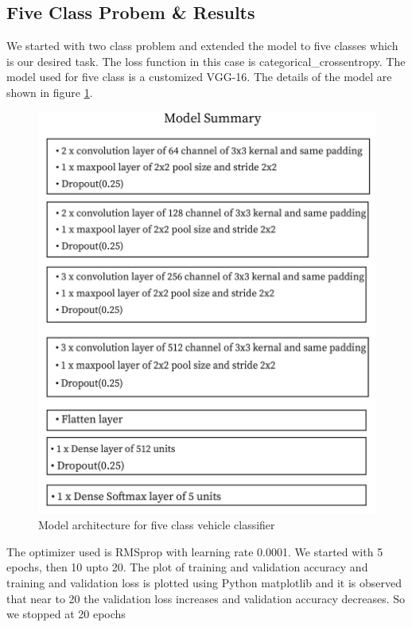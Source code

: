 \subsection{Five Class Probem \& Results}
We started with two class problem and extended the model to five classes
which is our desired task. The loss function in this case is categorical\_crossentropy.
The model used for five class is a customized VGG-16. The details of the
model are shown in figure \ref{model_summary}.
\begin{figure}[H]
    \centering
    \captionsetup{justification = centering}
    \includegraphics[scale = 0.8]{CHAPTERS/Chapter-4/Images/summary.jpg}
    \caption{Model architecture for five class vehicle classifier} 
    \label{model_summary}
\end{figure}
\noindent The optimizer used is RMSprop with
learning rate 0.0001. We started with 5 epochs, then 10 upto 20. The plot of training
and validation accuracy and training and validation loss is plotted using Python
matplotlib and it is observed that near to 20 the validation loss
increases and validation accuracy decreases. So we stopped at 20 epochs
